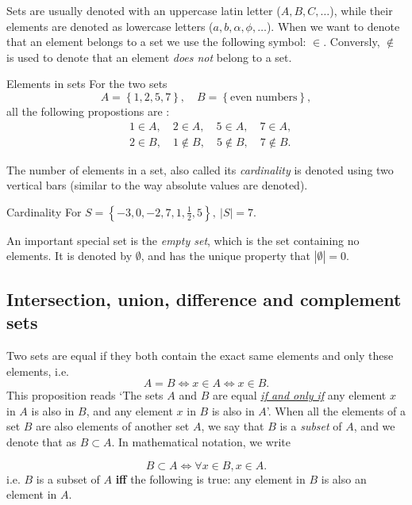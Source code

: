 Sets are usually denoted with an uppercase latin letter ($A,B,C,\dots$), while their elements are denoted as lowercase letters ($a,b,\alpha,\phi,\dots$). When we want to denote that an element belongs to a set we use the following symbol: $\in$. Conversly, $\notin$ is used to denote that an element \textit{does not} belong to a set.
	
\begin{example}{Elements in sets}{}
	For the two sets
	\[
		A = \left\{ 1,2,5,7 \right\},\quad B=\left\{ \text{even numbers} \right\},
	\]
	all the following propostions are \true{}:
	\begin{align*}
		&1\in A,\quad 2\in A,\quad 5\in A,\quad 7\in A,\\
		&2\in B,\quad 1\notin B,\quad 5\notin B,\quad 7\notin B.
	\end{align*}
\end{example}

The number of elements in a set, also called its \emph{cardinality} is denoted using two vertical bars (similar to the way absolute values are denoted).

\begin{example}{Cardinality}{}
	For $S=\left\{ -3,0,-2,7,1,\frac{1}{2},5 \right\},\ |S|=7$.
\end{example}

An important special set is the \emph{empty set}, which is the set containing no elements. It is denoted by $\emptyset$, and has the unique property that $|\emptyset|=0$.

\subsection{Intersection, union, difference and complement sets}

Two sets are equal if they both contain the exact same elements and only these elements, i.e.
\begin{equation}
	A = B \Longleftrightarrow x\in A \Leftrightarrow x\in B.
	\label{eq:set_equality}
\end{equation}
This proposition reads `The sets $A$ and $B$ are equal \underline{\textit{if and only if}} any element $x$ in $A$ is also in $B$, and any element $x$ in $B$ is also in $A$'. When all the elements of a set $B$ are also elements of another set $A$, we say that $B$ is a \emph{subset} of $A$, and we denote that as $B\subset A$. In mathematical notation, we write

\begin{equation}
	B\subset A \Leftrightarrow \forall x\in B, x\in A.
	\label{eq:subset_def}
\end{equation}
i.e. $B$ is a subset of $A$ \textbf{iff} the following is true: any element in $B$ is also an element in $A$.

